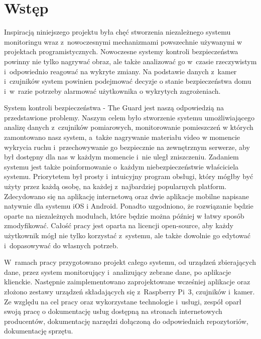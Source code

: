 \chapter{Wstęp}
Inspiracją niniejszego projektu była chęć stworzenia niezależnego systemu monitoringu wraz z~nowoczesnymi mechanizmami powszechnie używanymi w projektach programistycznych.
Nowoczesne systemy kontroli bezpieczeństwa powinny nie tylko nagrywać obraz, ale także analizować go w~czasie rzeczywistym i~odpowiednio reagować na wykryte zmiany. Na podstawie danych z~kamer i~czujników system powinien podejmować decyzje o stanie bezpieczeństwa domu i~w~razie potrzeby alarmować użytkownika o wykrytych zagrożeniach.

System kontroli bezpieczeństwa - The Guard jest naszą odpowiedzią na przedstawione problemy. Naszym celem było stworzenie systemu umożliwiającego analizę danych z~czujników pomiarowych, monitorowanie pomieszczeń w których zamontowano nasz system, a~także nagrywanie materiału video w momencie wykrycia ruchu i~przechowywanie go bezpiecznie na zewnętrznym serwerze, aby był dostępny dla nas w każdym momencie i~nie uległ zniszczeniu. Zadaniem systemu jest także poinformowanie o~każdym niebezpieczeństwie właściciela systemu. Priorytetem był prosty i~intuicyjny program obsługi, który mógłby być użyty przez każdą osobę, na każdej z~najbardziej popularnych platform. Zdecydowano się na aplikację internetową oraz dwie aplikacje mobilne napisane natywnie dla systemu iOS i Android. Ponadto uzgodniono, że rozwiązanie będzie oparte na niezależnych modułach, które będzie można później w łatwy sposób zmodyfikować. Całość pracy jest oparta na licencji open-source, aby każdy użytkownik mógł nie tylko korzystać z~systemu, ale także dowolnie go edytować i~dopasowywać do własnych potrzeb.

W~ramach pracy przygotowano projekt całego systemu, od urządzeń zbierających dane, przez system monitorujący i~analizujący zebrane dane, po aplikacje klienckie. Następnie zaimplementowano zaprojektowane wcześniej aplikacje oraz złożono zestawy urządzeń składających się z~Raspberry Pi~3, czujników i~kamer.
Ze względu na cel pracy oraz wykorzystane technologie i~usługi, zespół oparł swoją pracę o dokumentację usług dostępną na stronach internetowych producentów, dokumentację narzędzi dołączoną do odpowiednich repozytoriów, dokumentację sprzętu.

